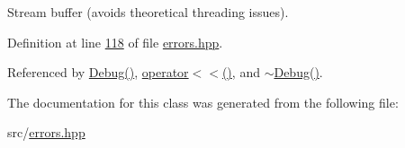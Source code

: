 Stream buffer (avoids theoretical threading issues). 



Definition at line \hyperlink{errors_8hpp_source_l00118}{118} of file \hyperlink{errors_8hpp_source}{errors.\+hpp}.



Referenced by \hyperlink{errors_8hpp_source_l00081}{Debug()}, \hyperlink{errors_8hpp_source_l00099}{operator$<$$<$()}, and \hyperlink{errors_8hpp_source_l00087}{$\sim$\+Debug()}.



The documentation for this class was generated from the following file\+:\begin{DoxyCompactItemize}
\item 
src/\hyperlink{errors_8hpp}{errors.\+hpp}\end{DoxyCompactItemize}
